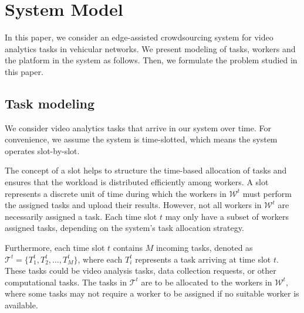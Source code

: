 \section{System Model}
In this paper, we consider an edge-assisted crowdsourcing system for video analytics tasks in vehicular networks. {\color{blue}We present modeling of tasks, workers and the platform in the system as follows. Then, we formulate the problem studied in this paper.}


\subsection{Task modeling}
{\color{blue}We consider video analytics tasks that arrive in our system over time. For convenience, we assume the system is time-slotted, which means the system operates slot-by-slot.} 



The concept of a slot helps to structure the time-based allocation of tasks and ensures that the workload is distributed efficiently among workers. A slot represents a discrete unit of time during which the workers in \( \mathcal{W}^t \) must perform the assigned tasks and upload their results. However, not all workers in \( \mathcal{W}^t \) are necessarily assigned a task. Each time slot \( t \) may only have a subset of workers assigned tasks, depending on the system's task allocation strategy.

Furthermore, each time slot \( t \) contains \( M \) incoming tasks, denoted as \( \mathcal{T}^t = \{ T_1^t, T_2^t, \dots, T_M^t \} \), where each \( T_i^t \) represents a task arriving at time slot \( t \). These tasks could be video analysis tasks, data collection requests, or other computational tasks. The tasks in \( \mathcal{T}^t \) are to be allocated to the workers in \( \mathcal{W}^t \), where some tasks may not require a worker to be assigned if no suitable worker is available.

